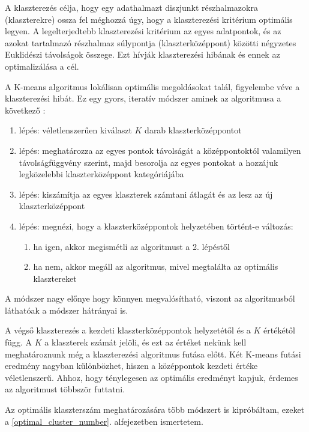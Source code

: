 A klaszterezés célja, hogy egy adathalmazt diszjunkt részhalmazokra (klaszterekre) ossza fel méghozzá úgy, hogy a klaszterezési kritérium optimális legyen. A legelterjedtebb klaszterezési kritérium az egyes adatpontok, és az azokat tartalmazó részhalmaz súlypontja (klaszterközéppont) közötti négyzetes Euklidészi távolságok összege. Ezt hívják klaszterezési hibának és ennek az optimalizálása a cél. \cite{kmeans}

A K-means algoritmus lokálisan optimális megoldásokat talál, figyelembe véve a klaszterezési hibát. Ez egy gyors, iteratív módszer aminek az algoritmusa a következő \cite{tomatoleaf}:
\begin{enumerate}
\item lépés: véletlenszerűen kiválaszt $K$ darab klaszterközéppontot
\item lépés: meghatározza az egyes pontok távolságát a középpontoktól valamilyen távolságfüggvény szerint, majd besorolja az egyes pontokat a hozzájuk legközelebbi klaszterközéppont kategóriájába
\item lépés: kiszámítja az egyes klaszterek számtani átlagát és az lesz az új klaszterközéppont
\item lépés: megnézi, hogy a klaszterközéppontok helyzetében történt-e változás:
    \begin{enumerate}
    \item ha igen, akkor megismétli az algoritmust a 2. lépéstől
    \item ha nem, akkor megáll az algoritmus, mivel megtalálta az optimális klasztereket
    \end{enumerate}
\end{enumerate}

A módszer nagy előnye hogy könnyen megvalósítható, viszont az algoritmusból láthatóak a módszer hátrányai is.

A végső klaszterezés a kezdeti klaszterközéppontok helyzetétől és a $K$ értékétől függ. A $K$ a klaszterek számát jelöli, és ezt az értéket nekünk kell meghatároznunk még a klaszterezési algoritmus futása előtt. Két K-means futási eredmény nagyban különbözhet, hiszen a középpontok kezdeti értéke véletlenszerű. Ahhoz, hogy ténylegesen az optimális eredményt kapjuk, érdemes az algoritmust többször futtatni.

Az optimális klaszterszám meghatározására több módszert is kipróbáltam, ezeket a \ref{optimal_cluster_number}. alfejezetben ismertetem.

